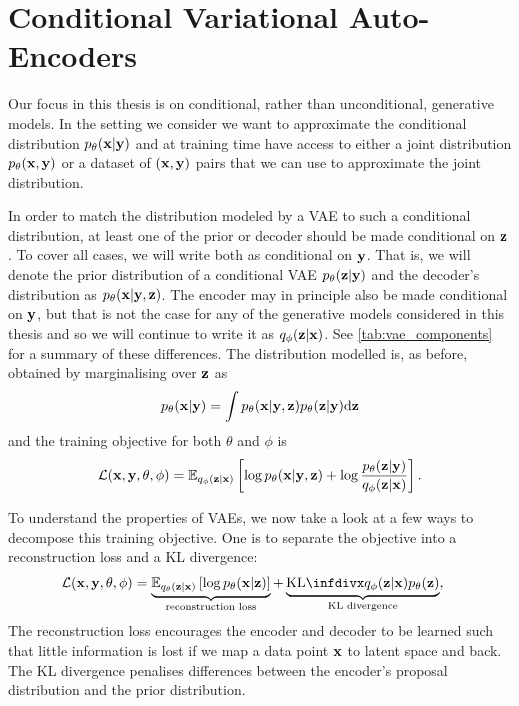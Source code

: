 \section{Conditional Variational Auto-Encoders}
Our focus in this thesis is on conditional, rather than unconditional, generative models. In the setting we consider we want to approximate the conditional distribution $p_\theta({\mathbf{x}}|{\mathbf{y}})$ and at training time have access to either a joint distribution $p_\theta({\mathbf{x}},{\mathbf{y}})$ or a dataset of $({\mathbf{x}}, {\mathbf{y}})$ pairs that we can use to approximate the joint distribution.

In order to match the distribution modeled by a VAE to such a conditional distribution, at least one of the prior or decoder should be made conditional on ${\mathbf{z}}$. To cover all cases, we will write both as conditional on ${\mathbf{y}}$. That is, we will denote the prior distribution of a conditional VAE $p_\theta({\mathbf{z}}|{\mathbf{y}})$ and the decoder's distribution as $p_\theta({\mathbf{x}}|{\mathbf{y}},{\mathbf{z}})$. The encoder may in principle also be made conditional on ${\mathbf{y}}$, but that is not the case for any of the generative models considered in this thesis and so we will continue to write it as $q_\phi({\mathbf{z}}|{\mathbf{x}})$. See \cref{tab:vae_components} for a summary of these differences. The distribution modelled is, as before, obtained by marginalising over ${\mathbf{z}}$ as
\begin{equation} \label{eq:vae-marginal}
p_\theta({\mathbf{x}}|{\mathbf{y}}) = \int p_\theta({\mathbf{x}}|{\mathbf{y}},{\mathbf{z}})p_\theta({\mathbf{z}}|{\mathbf{y}}) \mathrm{d}{\mathbf{z}}
\end{equation}
and the training objective for both $\theta$ and $\phi$ is
\begin{equation}
    {\mathcal{L}}({\mathbf{x}}, {\mathbf{y}}, \theta, \phi) = \mathbb{E}_{q_\phi({\mathbf{z}}|{\mathbf{x}})} \left[ \log p_\theta({\mathbf{x}}|{\mathbf{y}},{\mathbf{z}}) + \log \frac{p_\theta({\mathbf{z}}|{\mathbf{y}})}{q_\phi({\mathbf{z}}|{\mathbf{x}})} \right].
\end{equation}

To understand the properties of VAEs, we now take a look at a few ways to decompose this training objective. One is to separate the objective into a reconstruction loss and a KL divergence:
\begin{align}
    \gL(\rvx, \rvy, \theta, \phi) &= \underbrace{\EX_{q_\theta(\rvz|\rvx)} \left[ \log p_\theta(\rvx|\rvz) \right]}_\text{reconstruction loss} + \underbrace{\kl{q_\phi(\rvz|\rvx)}{p_\theta(\rvz)}}_\text{KL divergence},
\label{eq:marginal-is}
\end{align}
The reconstruction loss encourages the encoder and decoder to be learned such that little information is lost if we map a data point ${\mathbf{x}}$ to latent space and back. The KL divergence penalises differences between the encoder's proposal distribution and the prior distribution.

